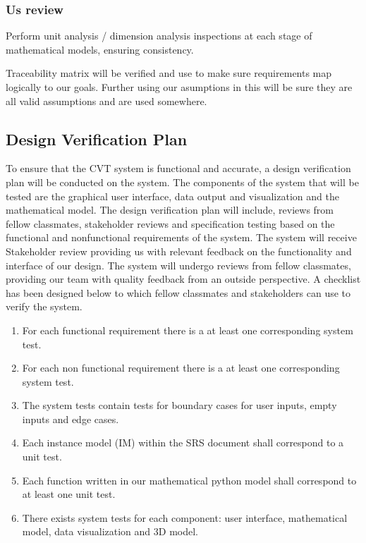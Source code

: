 \documentclass[12pt, titlepage]{article}
\begin{document}
\subsubsection*{Us review}

Perform unit analysis / dimension analysis inspections at each stage of mathematical models, ensuring consistency.

Traceability matrix will be verified and use to make sure requirements map logically to our goals. Further using our asumptions in this will be sure they are all valid assumptions and are used somewhere.

\subsection{Design Verification Plan}




\noindent To ensure that the CVT system is functional and accurate, a design verification plan will be conducted on the system. 
The components of the system that will be tested are the graphical user interface, data output and visualization and the mathematical model. 
The design verification plan will include, reviews from fellow classmates, stakeholder reviews and specification testing based on the functional and nonfunctional requirements of the system. 
The system will receive Stakeholder review providing us with relevant feedback on the functionality and interface of our design.
The system will undergo reviews from fellow classmates, providing our team with quality feedback from an outside perspective. 
A checklist has been designed below to which fellow classmates and stakeholders can use to verify the system.  


\begin{enumerate}
  \item For each functional requirement there is a at least one corresponding system test.
  \item For each non functional requirement there is a at least one corresponding system test.  
  \item The system tests contain tests for boundary cases for user inputs, empty inputs and edge cases. 
  \item Each instance model (IM) within the SRS document shall correspond to a unit test. 
  \item Each function written in our mathematical python model shall correspond to at least one unit test. 
  \item There exists system tests for each component: user interface, mathematical model, data visualization and 3D model. 
\end{enumerate}
\end{document}
